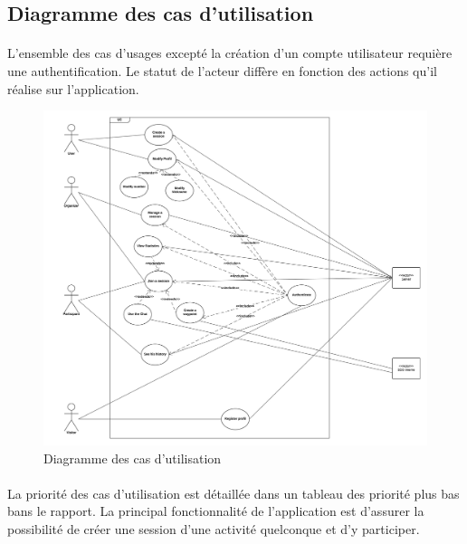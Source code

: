 \documentclass[titlepage, 12pt]{report}
\begin{document}
\subsection{Diagramme des cas d'utilisation}

\paragraph{}L'ensemble des cas d'usages excepté la création d'un compte utilisateur requière une authentification. Le statut de l'acteur diffère en fonction des actions qu'il réalise sur l'application. 

\begin{figure}[!h]
	\caption{Diagramme des cas d'utilisation}
	\label{use_case_diagram}
	\centering
	\includegraphics[scale=0.5]{Images/diagram/use_case_diagram.png}
\end{figure}

\clearpage

\paragraph{}La priorité des cas d'utilisation est détaillée dans un tableau des priorité plus bas bans le rapport. La principal fonctionnalité de l'application est d'assurer la possibilité de créer une session d'une activité quelconque et d'y participer.
\end{document}
